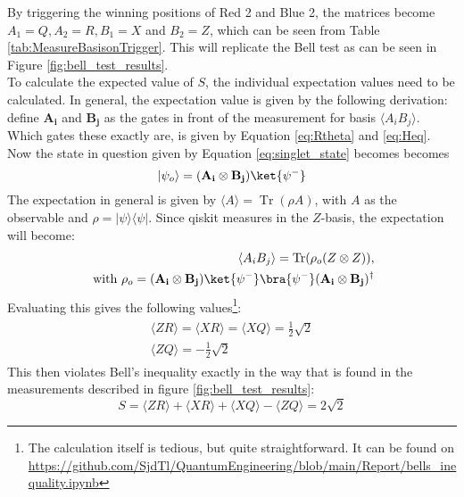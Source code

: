 \documentclass[final,5p,times,twocolumn,authoryear]{elsarticle}
\begin{document}
By triggering the winning positions of Red 2 and Blue 2, the matrices become $A_{1} = Q, A_{2} = R, B_{1} = X$ and $ B_{2} = Z $, which can be seen from Table \ref{tab:MeasureBasisonTrigger}. This will replicate the Bell test as can be seen in Figure \ref{fig:bell_test_results}. \\
To calculate the expected value of $S$, the individual expectation values need to be calculated. In general, the expectation value is given by the following derivation: define $\mathbf{A_{i}}$ and $\mathbf{B_j}$ as the gates in front of the measurement for basis $\langle A_iB_j \rangle$. Which gates these exactly are, is given by Equation \ref{eq:Rtheta} and \ref{eq:Heq}. Now the state in question given by Equation \ref{eq:singlet_state} becomes becomes
\begin{equation}
|\psi_o \rangle = (\mathbf{A_{i}} \otimes \mathbf{B_j})\ket{\psi^-}
\end{equation}
The expectation in general is given by $\langle A \rangle = \operatorname{Tr}(\rho A)$, with $A$ as the observable and $\rho=|\psi \rangle \langle \psi |$. Since qiskit measures in the $Z$-basis, the expectation will become:
\begin{align}
    \begin{split}
        \langle A_i B_j \rangle = \operatorname{Tr}(\rho_o (Z\otimes Z)), \\
        \text{ with } \rho_o= (\mathbf{A_{i}} \otimes \mathbf{B_j})\ket{\psi^-}\bra{\psi^-}(\mathbf{A_{i}} \otimes \mathbf{B_j})^\dagger
    \end{split}
\end{align}
Evaluating this gives the following values\footnote{The calculation itself is tedious, but quite straightforward. It can be found on \url{https://github.com/SjdTl/QuantumEngineering/blob/main/Report/bells_inequality.ipynb}}:
\begin{align}
    \begin{split}
        \langle ZR \rangle = \langle XR \rangle = \langle XQ \rangle = \tfrac{1}{2}\sqrt{2} \\
        \langle ZQ \rangle = - \tfrac{1}{2} \sqrt{2}
    \end{split}
\end{align}
This then violates Bell's inequality exactly in the way that is found in the measurements described in figure \ref{fig:bell_test_results}:
\begin{equation}
    S=\langle ZR \rangle + \langle XR \rangle + \langle XQ \rangle - \langle ZQ \rangle = 2 \sqrt{2}
\end{equation}
\end{document}
